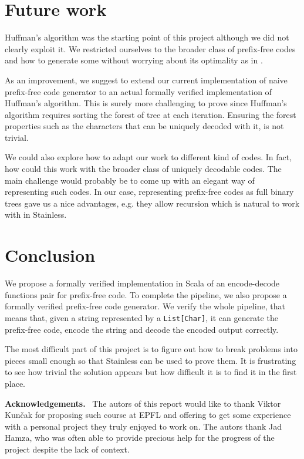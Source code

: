 \documentclass[a4paper,UKenglish,cleveref, autoref, thm-restate]{lipics-v2021}
\begin{document}
\section{Future work}

Huffman's algorithm was the starting point of this project although we did not clearly exploit it. We restricted ourselves to the broader class of prefix-free codes and how to generate some without worrying about its optimality as in \cite{blanchette}. 

As an improvement, we suggest to extend our current implementation of naive prefix-free code generator to an actual formally verified implementation of Huffman's algorithm. This is surely more challenging to prove since Huffman's algorithm requires sorting the forest of tree at each iteration. Ensuring the forest properties such as the characters that can be uniquely decoded with it, is not trivial.

We could also explore how to adapt our work to different kind of codes. In fact, how could this work with the broader class of uniquely decodable codes. 
The main challenge would probably be to come up with an elegant way of representing such codes. 
In our case, representing prefix-free codes as full binary trees gave us a nice advantages, e.g. they allow recursion which is natural to work with in Stainless.

\section{Conclusion}
We propose a formally verified implementation in Scala of an encode-decode functions pair for prefix-free code. To complete the pipeline, we also propose a formally verified prefix-free code generator.
We verify the whole pipeline, that means that, given a string represented by a \lstinline{List[Char]}, it can generate the prefix-free code, encode the string and decode the encoded output correctly.

The most difficult part of this project is to figure out how to break problems into pieces small enough so that Stainless can be used to prove them. 
It is frustrating to see how trivial the solution appears but how difficult it is to find it in the first place.

\vspace{0.5cm} %
\noindent %
\textbf{\large Acknowledgements.}\ %
The autors of this report would like to thank Viktor Kun\v{c}ak for proposing such course at EPFL and offering to get some experience with a personal project they truly enjoyed to work on. The autors thank Jad Hamza, who was often able to provide precious help for the progress of the project despite the lack of context.


\end{document}
